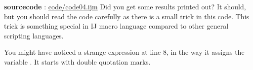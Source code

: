 \textbf{sourcecode} : \href{http://www.example.com/contents}{code/code04.ijm}
Did you get some results printed out? It should, but you should read the code carefully as there is a small trick in this code.  This trick is something special in IJ macro language compared to other general scripting languages.

You might have noticed a strange expression at line 8, in the way it assigns the variable . 
It starts with double quotation marks. \\